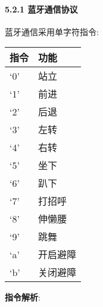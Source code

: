 \documentclass[
]{article}
\begin{document}
\hypertarget{ux84ddux7259ux901aux4fe1ux534fux8bae}{%
\paragraph{5.2.1
蓝牙通信协议}\label{ux84ddux7259ux901aux4fe1ux534fux8bae}}

蓝牙通信采用单字符指令:

\begin{longtable}[]{@{}ll@{}}
\toprule
指令 & 功能\tabularnewline
\midrule
\endhead
`0' & 站立\tabularnewline
`1' & 前进\tabularnewline
`2' & 后退\tabularnewline
`3' & 左转\tabularnewline
`4' & 右转\tabularnewline
`5' & 坐下\tabularnewline
`6' & 趴下\tabularnewline
`7' & 打招呼\tabularnewline
`8' & 伸懒腰\tabularnewline
`9' & 跳舞\tabularnewline
`a' & 开启避障\tabularnewline
`b' & 关闭避障\tabularnewline
\bottomrule
\end{longtable}

\textbf{指令解析}:
\end{document}
